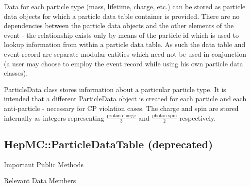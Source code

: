 \documentclass[11pt,letterpaper]{article}
\begin{document}
Data for each particle type (mass, lifetime, charge, etc.) can be
stored as particle data objects for which a particle data table
container is provided. There are no dependencies between the particle
data objects and the other elements of the event - the relationship
exists only by means of the particle id which is used to lookup
information from within a particle data table. As such the data table
and event record are separate modular entities which need not be used
in conjunction (a user may choose to employ the event record while
using his own particle data classes).

ParticleData class stores information about a particular particle
type. It is intended that a different ParticleData object is created 
for each particle and each anti-particle - necessary for CP violation
cases. The charge and spin are stored internally as integers representing
$\frac{\mbox{proton charge}}{3}$ and $\frac{\mbox{photon spin}}{2}$
respectively. 

%
%

\subsection{HepMC::ParticleDataTable (deprecated)}
\begin{myitemize}{Important Public Methods}
\end{myitemize}
\begin{myitemize}{Relevant Data Members}
\end{myitemize}
\end{document}
